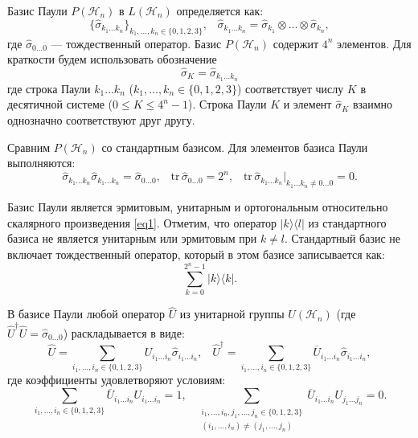 \documentclass[a4paper]{report}
\begin{document}
Базис Паули ${P(\mathcal{H}_n)}$ в ${L(\mathcal{H}_n)}$ определяется как:
\begin{equation}\label{eq3}
    \{\hat{\sigma}_{k_1\ldots k_n}\}_{k_1,\ldots,k_n\in\{0,1,2,3\}},\;\;\;
    \hat{\sigma}_{k_1\ldots k_n} = \hat{\sigma}_{k_1}\otimes\ldots\otimes\hat{\sigma}_{k_n},
\end{equation}
\noindent где ${\hat{\sigma}_{0\ldots 0}}$ — тождественный оператор. Базис ${P(\mathcal{H}_n)}$ содержит ${4^n}$ элементов. Для краткости будем использовать обозначение
\begin{equation}\label{sigma-K}
\hat{\sigma}_K = \hat{\sigma}_{k_1\ldots k_n}
\end{equation}
где строка Паули ${k_1\ldots k_n}$ (${k_1,\ldots,k_n \in \{0,1,2,3\}}$) соответствует числу ${K}$ в десятичной системе (${0 \leq K \leq 4^n - 1}$). Строка Паули ${K}$ и элемент ${\hat{\sigma}_K}$ взаимно однозначно соответствуют друг другу.

Сравним ${P(\mathcal{H}_n)}$ со стандартным базисом. Для элементов базиса Паули выполняются:
\begin{equation}\label{eq4}
    \hat{\sigma}_{k_1\ldots k_n} \hat{\sigma}_{k_1\ldots k_n} = \hat{\sigma}_{0\ldots 0}, \;\;\;
    \mathrm{tr}\,\hat{\sigma}_{0\ldots 0} = 2^n,\;\;\;
    \mathrm{tr}\,\hat{\sigma}_{k_1\ldots k_n}\Big|_{k_1\ldots k_n \neq 0\ldots0} = 0.
\end{equation}

Базис Паули является эрмитовым, унитарным и ортогональным относительно скалярного произведения \eqref{eq1}. Отметим, что оператор ${|k\rangle\langle l|}$ из стандартного базиса не является унитарным или эрмитовым при ${k \neq l}$. Стандартный базис не включает тождественный оператор, который в этом базисе записывается как:
$${
    \sum_{k=0}^{2^n-1} |k\rangle \langle k|.
}$$

В базисе Паули любой оператор ${\hat{U}}$ из унитарной группы ${U(\mathcal{H}_n)}$ (где $\hat{U}^\dagger\hat{U} = \hat{\sigma}_{0\ldots0}$) раскладывается в виде:
$${
    \hat{U} = \sum_{i_1,\ldots,i_n\in\{0,1,2,3\}} U_{i_1\ldots i_n}\hat{\sigma}_{i_1\ldots i_n},\;\;\;
    \hat{U}^\dagger = \sum_{i_1,\ldots,i_n\in\{0,1,2,3\}} \overline{U}_{i_1\ldots i_n}\hat{\sigma}_{i_1\ldots i_n},
}$$
где коэффициенты удовлетворяют условиям:
$${
    \sum_{i_1,\ldots,i_n\in\{0,1,2,3\}} \overline{U}_{i_1\ldots i_n}U_{i_1\ldots i_n} = 1,\;\;\;
    \sum_{\substack{
        i_1,\ldots,i_n,j_1,\ldots,j_n\in\{0,1,2,3\} \\
        (i_1,\ldots,i_n)\neq(j_1,\ldots,j_n)
    }} \overline{U}_{i_1\ldots i_n}U_{j_1\ldots j_n} = 0.
}$$
\end{document}
